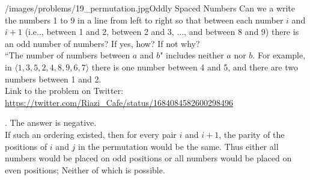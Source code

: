 \begin{problem}{/images/problems/19_permutation.jpg}{Oddly Spaced Numbers}
    Can we a write the numbers 1 to 9 in a line from left to right  so that between each number $i$ and $i+1$ (i.e.., between 1 and 2, between 2 and 3, $\ldots$, and between 8 and 9) there is an odd number of numbers? If yes, how? If not why?\\[0.2cm]

``The number of numbers between $a$ and $b$" includes neither $a$ nor $b$. For example, in $\langle 1,3,5,2,4,8,9,6,7 \rangle$ there is one number between 4 and 5, and there are two numbers between 1 and 2.\\[0.2cm]

Link to the problem on Twitter:  \url{https://twitter.com/Riazi_Cafe/status/1684084582600298496}
\end{problem}
\begin{solution}.
The answer is negative.\\[0.2cm]

If such an ordering existed, then for every pair $i$ and $i+1$, the parity of the positions of $i$ and $j$ in the permutation would be the same. Thus either all numbers would be placed on odd positions or all numbers would be placed on even positions; Neither of which is  possible.

\end{solution}
